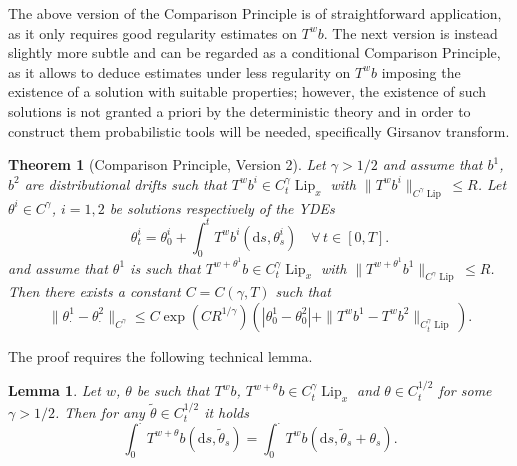 \documentclass[10pt]{article}
\newcommand{\mathd}{\mathrm{d}}
\newcommand{\tmop}[1]{\ensuremath{\operatorname{#1}}}
\newtheorem{lemma}{Lemma}
\newtheorem{theorem}{Theorem}
\begin{document}
The above version of the Comparison Principle is of straightforward
application, as it only requires good regularity estimates on $T^w b$. The
next version is instead slightly more subtle and can be regarded as a
conditional Comparison Principle, as it allows to deduce estimates under less
regularity on $T^w b$ imposing the existence of a solution with suitable
properties; however, the existence of such solutions is not granted a priori
by the deterministic theory and in order to construct them probabilistic tools
will be needed, specifically Girsanov transform.

\begin{theorem}[Comparison Principle, Version 2]
  \label{sec4.1 comparison thm v2}Let $\gamma > 1 / 2$ and assume that $b^1$,
  $b^2$ are distributional drifts such that $T^w b^i \in C^{\gamma}_t
  \tmop{Lip}_x$ with $\| T^w b^i \|_{C^{\gamma} \tmop{Lip}} \leqslant R$. Let
  $\theta^i \in C^{\gamma}$, $i = 1, 2$ be solutions respectively of the YDEs
  \[ \theta_t^i = \theta_0^i + \int_0^t T^w b^i (\mathd s, \theta^i_s)  \quad
     \forall \, t \in [0, T] . \]
  and assume that $\theta^1$ is such that $T^{w + \theta^1} b \in C^{\gamma}_t
  \tmop{Lip}_x$ with $\| T^{w + \theta^1} b^1 \|_{C^{\gamma} \tmop{Lip}}
  \leqslant R$. Then there exists a constant $C = C (\gamma, T)$ such that
  \begin{equation}
    \| \theta^1_{\cdot} - \theta^2_{\cdot} \|_{C^{\gamma}} \leqslant C \exp (C
    R^{1 / \gamma}) (| \theta^1_0 - \theta^2_0 | + \| T^w b^1 - T^w b^2
    \|_{C^{\gamma}_t \tmop{Lip}}) . \label{sec4.1 comparison v2}
  \end{equation}
\end{theorem}

The proof requires the following technical lemma.

\begin{lemma}
  \label{sec4.1 technical lemma 2}Let $w$, $\theta$ be such that $T^w b$,
  $T^{w + \theta} b \in C^{\gamma}_t \tmop{Lip}_x$ and $\theta \in C^{1 /
  2}_t$ for some $\gamma > 1 / 2$. Then for any $\tilde{\theta} \in C^{1 /
  2}_t$ it holds
  \begin{equation}
    \int_0^{\cdot} T^{w + \theta} b (\mathd s, \tilde{\theta}_s) =
    \int_0^{\cdot} T^w b (\mathd s, \tilde{\theta}_s + \theta_s) .
    \label{sec4.1 eq techlem}
  \end{equation}
\end{lemma}
\end{document}
